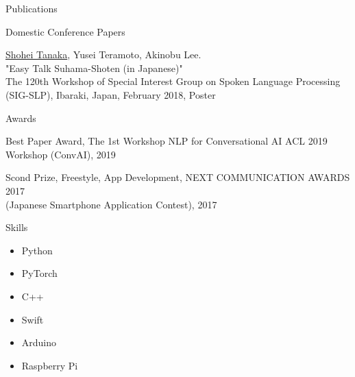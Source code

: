 \documentclass{resume} %
\begin{document}
\begin{rSection}{Publications}
\begin{rSubsection}{Domestic Conference Papers}{}{}{}
\item \underline{Shohei Tanaka}, Yusei Teramoto, Akinobu Lee.
\\"Easy Talk Suhama-Shoten (in Japanese)"
\\The 120th Workshop of Special Interest Group on Spoken Language Processing (SIG-SLP), Ibaraki, Japan, February 2018, Poster
\end{rSubsection}

\end{rSection}


\begin{rSection}{Awards}

\begin{rSubsection}{}{}{}{}
    \item Best Paper Award, The 1st Workshop NLP for Conversational AI ACL 2019 Workshop (ConvAI), 2019
    \item Scond Prize, Freestyle, App Development, NEXT COMMUNICATION AWARDS 2017
    \\(Japanese Smartphone Application Contest), 2017
\end{rSubsection}

\end{rSection}


\begin{rSection}{Skills}

\begin{multicols}{3}
\begin{itemize}
    \item Python
    \item PyTorch
    \item C++
    \item Swift
    \item Arduino
    \item Raspberry Pi
\end{itemize}
\end{multicols}

\end{rSection}

\end{document}

